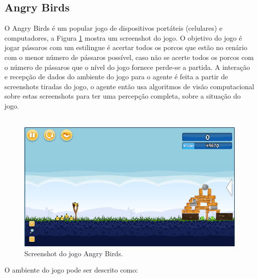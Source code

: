 \documentclass[10pt,a4paper]{article}
\begin{document}
\subsection{Angry Birds}
\label{sec:angryBirds}
O Angry Birds é um popular jogo de dispositivos portáteis (celulares) e computadores, a Figura \ref{fig:AngryBirds} mostra um screenshot do jogo. O objetivo do jogo é jogar pássaros com um estilingue é acertar todos os porcos que estão no cenário com o menor número de pássaros possível, caso não  se acerte todos os porcos com o número de pássaros que o nível do jogo fornece perde-se a partida. A interação  e recepção de dados do ambiente do jogo para o agente é feita a partir de screenshots tiradas do jogo, o agente então usa algoritmos de visão computacional sobre estas screenshots para ter uma percepção completa, sobre a situação do jogo.   \\ \\
\begin{figure}[H]
  \center
  \includegraphics[scale=0.5]{imgs/angryBirds.png}            
  \caption{Screenshot do jogo Angry Birds.}
  \label{fig:AngryBirds}
\end{figure}
O ambiente do jogo pode ser descrito como: 
\end{document}
